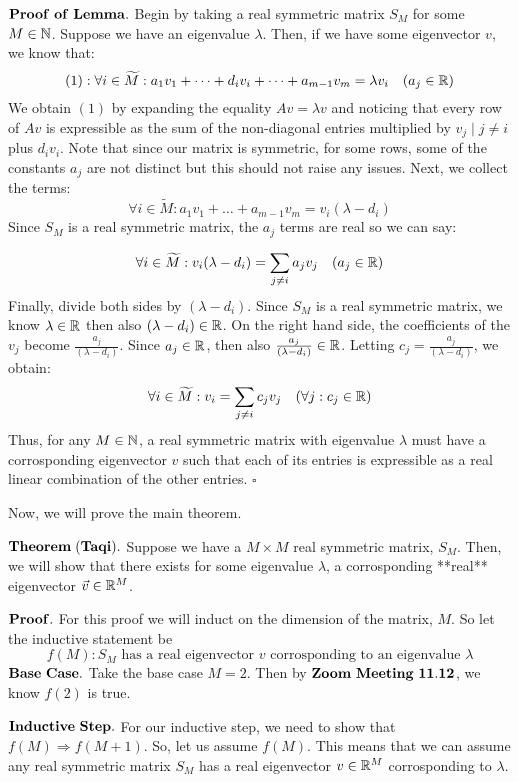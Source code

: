 $\bf Proof \,\,of\,\, Lemma.$ Begin by taking a real symmetric matrix $S_M$ for some $M \in \mathbb{N}$. Suppose we have an eigenvalue $\lambda$. Then, if we have some eigenvector $v$, we know that:
$$(1): \forall i \in \widetilde{M} : a_1v_1 + \dots + d_iv_i + \dots + a_{m-1}v_m = \lambda v_i \quad ( a_j \in \mathbb{R})$$
We obtain $(1)$ by expanding the equality $Av = \lambda v$ and noticing that every row of $Av$ is expressible as the sum of the non-diagonal entries multiplied by $v_j \mid j \neq i$ plus $d_i v_i$. Note that since our matrix is symmetric, for some rows, some of the constants $a_j$ are not distinct but this should not raise any issues. Next, we collect the terms:
$$\forall i \in \widetilde{M} : a_1v_1 + \dots + a_{m-1}v_m =  v_i(\lambda - d_i)$$
Since $S_M$ is a real symmetric matrix, the $a_j$ terms are real so we can say:

$$\forall i \in \widetilde{M} :  v_i(\lambda - d_i) = \sum_{j \neq i} a_jv_j \quad (a_j \in \mathbb{R})$$
Finally, divide both sides by $(\lambda - d_i)$. Since $S_M$ is a real symmetric matrix, we know $\lambda \in \mathbb{R}$ then also $(\lambda - d_i) \in \mathbb{R}$. On the right hand side, the coefficients of the $v_j$ become $\frac{a_j}{(\lambda - d_i)}$. Since $a_j \in \mathbb{R}$, then also $\frac{a_j}{(\lambda - d_i)} \in \mathbb{R}$. Letting $c_j = \frac{a_j}{(\lambda - d_i)}$, we obtain:
$$\forall i \in \widetilde{M}: v_i =  {\sum_{j \neq i} c_j v_j} \quad (\forall j: c_j \in \mathbb{R})$$
Thus, for any $M \in \mathbb{N}$, a real symmetric matrix with eigenvalue $\lambda$ must have a corrosponding eigenvector $v$ such that each of its entries is expressible as a real linear combination of the other entries. $\square$

Now, we will prove the main theorem.

$\bf Theorem \; (Taqi).$ Suppose we have a $M \times M$ real symmetric matrix, $S_M$. Then, we will show that there exists for some eigenvalue $\lambda$, a corrosponding **real** eigenvector $\vec{v} \in \mathbb{R}^M$.

$\bf Proof.$ For this proof we will induct on the dimension of the matrix, $M$. So let the inductive statement be
$$f(M) : S_M\text{ has a real eigenvector } v \text{ corrosponding to an eigenvalue } \lambda$$
$\bf Base \,\, Case.$ Take the base case $M = 2$. Then by $\bf Zoom \,\,Meeting\,\, 11.12$, we know $f(2)$ is true.

$\bf Inductive \,\, Step.$ For our inductive step, we need to show that $f(M) \Rightarrow f(M+1)$. So, let us assume $f(M)$. This means that we can assume any real symmetric matrix $S_M$ has a real eigenvector $v \in \mathbb{R}^M$ corrosponding to $\lambda$.

